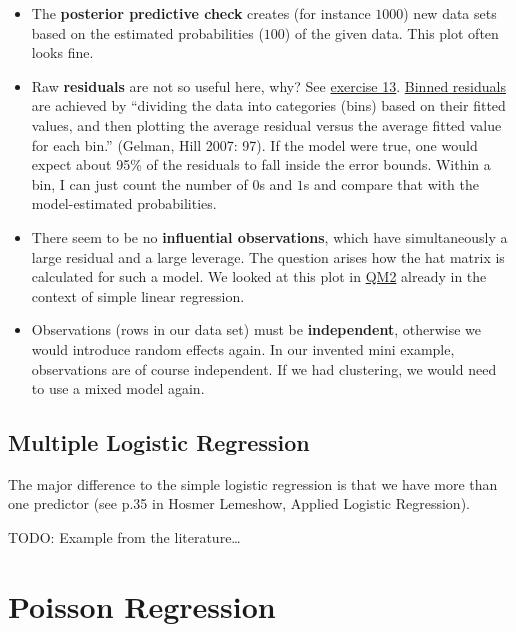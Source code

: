 \documentclass[
]{book}
\providecommand{\tightlist}{%
  \setlength{\itemsep}{0pt}\setlength{\parskip}{0pt}}
\begin{document}
\begin{itemize}
\tightlist
\item
  The \textbf{posterior predictive check} creates (for instance \(1000\)) new data sets
  based on the estimated probabilities (\(100\)) of the given data.
  This plot often looks fine.
\item
  Raw \textbf{residuals} are not so useful here, why? See \hyperref[exercise13_LMM]{exercise 13}.
  \href{https://easystats.github.io/performance/reference/binned_residuals.html}{Binned residuals}
  are achieved by ``dividing the data into categories (bins) based on
  their fitted values, and then plotting the average residual versus the
  average fitted value for each bin.'' (Gelman, Hill 2007: 97). If the
  model were true, one would expect about 95\% of the residuals to
  fall inside the error bounds.
  Within a bin, I can just count the number of \(0\)s and \(1\)s and
  compare that with the model-estimated probabilities.
\item
  There seem to be no \textbf{influential observations}, which have simultaneously a large
  residual and a large leverage. The question arises how the hat matrix
  is calculated for such a model.
  We looked at this plot in \href{https://jdegenfellner.github.io/Script_QM2_ZHAW/simple-linear-regression.html\#influential-observations-middle-right}{QM2}
  already in the context of simple linear regression.
\item
  Observations (rows in our data set) must be \textbf{independent}, otherwise we would introduce random effects again.
  In our invented mini example, observations are of course independent.
  If we had clustering, we would need to use a mixed model again.
\end{itemize}

\subsection{Multiple Logistic Regression}\label{multiple_logistic_regression}

The major difference to the simple logistic regression is that we have more
than one predictor (see p.35 in Hosmer Lemeshow, Applied Logistic Regression).

TODO: Example from the literature\ldots{}

\section{Poisson Regression}\label{poisson-regression}
\end{document}
